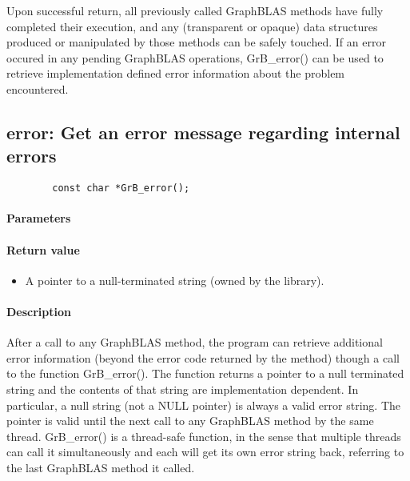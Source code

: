 Upon successful return, all previously called GraphBLAS methods have
fully completed their execution, and 
 any (transparent or opaque) data
structures produced or manipulated by those methods can be safely touched.
If an error occured in any pending GraphBLAS operations, {\sf GrB\_error()}
can be used to retrieve implementation defined
error information about the problem encountered.


\subsection{{error}: Get an error message regarding internal errors}


\begin{verbatim}
        const char *GrB_error();
\end{verbatim}

\paragraph{Parameters}

\paragraph{Return value}
\begin{itemize}[leftmargin=2.1in]
	\item A pointer to a null-terminated string (owned by the library).
\end{itemize}

\paragraph{Description}


After a call to any GraphBLAS method, the program can retrieve additional
error information (beyond the error code returned by the method) though a
call to the function {\sf GrB\_error()}. 
The function returns a pointer to a null terminated string and the contents of that string
are implementation dependent. In particular, a null string (not a {\sf NULL} pointer) is always a valid error string.
The pointer is valid until the next call to any GraphBLAS method by the same thread.
{\sf GrB\_error()} is a thread-safe function, in the sense that multiple threads can
call it simultaneously and each will get its own error string back, referring to the
last GraphBLAS method it called.
